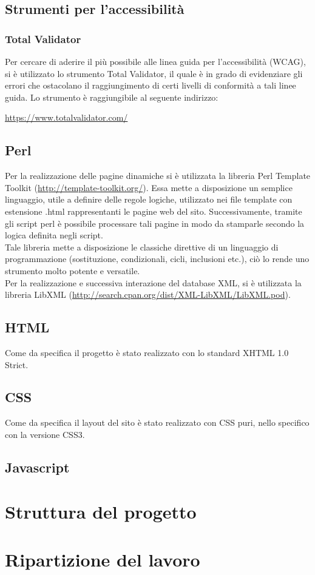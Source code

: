 	\subsection{Strumenti per l'accessibilità}
	
		\subsubsection{Total Validator}
		Per cercare di aderire il più possibile alle linea guida per l'accessibilità (WCAG), si è utilizzato lo strumento Total Validator, il quale è in grado di evidenziare gli errori che ostacolano il raggiungimento di certi livelli di conformità a tali linee guida. Lo strumento è raggiungibile al seguente indirizzo:
		\begin{center}
			\url{https://www.totalvalidator.com/}
		\end{center}
		
		
		
	
	\subsection{Perl}
	Per la realizzazione delle pagine dinamiche si è utilizzata la libreria Perl Template Toolkit (\url{http://template-toolkit.org/}). Essa mette a disposizione un semplice linguaggio, utile a definire delle regole logiche, utilizzato nei file template con estensione .html rappresentanti le pagine web del sito. Successivamente, tramite gli script perl è possibile processare tali pagine in modo da stamparle secondo la logica definita negli script. \\
	Tale libreria mette a disposizione le classiche direttive di un linguaggio di programmazione (sostituzione, condizionali, cicli, inclusioni etc.), ciò lo rende uno strumento molto potente e versatile. \\
	Per la realizzazione e successiva interazione del database XML, si è utilizzata la libreria LibXML (\url{http://search.cpan.org/dist/XML-LibXML/LibXML.pod}).
	\subsection{HTML}
	Come da specifica il progetto è stato realizzato con lo standard XHTML 1.0 Strict.
	\subsection{CSS}
	Come da specifica il layout del sito è stato realizzato con CSS puri, nello specifico con la versione CSS3.
	\subsection{Javascript}
	
\section{Struttura del progetto}
\section{Ripartizione del lavoro}
